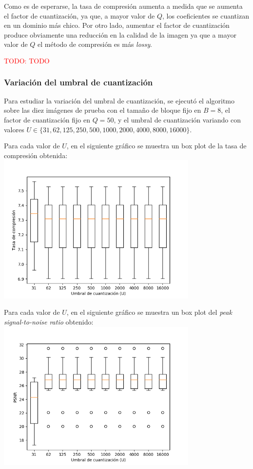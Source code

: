 \documentclass{article}
\newcommand{\set}[1]{\{#1\}}
\newcommand{\TODO}[1]{\textcolor{red}{TODO: #1}}
\begin{document}
Como es de esperarse, la tasa de compresión aumenta a medida que
se aumenta el factor de cuantización, ya que, a mayor valor de $Q$,
los coeficientes se cuantizan en un dominio más chico.
Por otro lado, aumentar el factor de cuantización produce obviamente
una reducción en la calidad de la imagen ya que a mayor valor de $Q$
el método de compresión es más {\em lossy}.

\TODO{TODO}

\newpage
\subsubsection{Variación del umbral de cuantización}

Para estudiar la variación del umbral de cuantización, se ejecutó el
algoritmo sobre las diez imágenes de prueba con el
tamaño de bloque fijo en $B = 8$,
el factor de cuantización fijo en $Q = 50$,
y el umbral de cuantización variando con valores
$U \in \set{31, 62, 125, 250, 500, 1000, 2000, 4000, 8000, 16000}$.

Para cada valor de $U$, en el siguiente gráfico se muestra un
box plot de la tasa de compresión obtenida:\\
\includegraphics[width=10cm]{../imgs/output/gray_plots/u_rate.png}

Para cada valor de $U$, en el siguiente gráfico se muestra un
box plot del {\em peak signal-to-noise ratio} obtenido:\\
\includegraphics[width=10cm]{../imgs/output/gray_plots/u_psnr.png}
\end{document}
